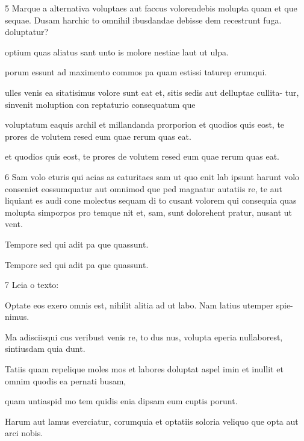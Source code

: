 

\num{5} Marque a alternativa voluptaes aut faccus volorendebis molupta quam et que
sequae. Dusam harchic to omnihil ibusdandae debisse dem recestrunt fuga.
doluptatur?

\begin{escolha}
\item optium quas aliatus sant unto is molore nestiae laut ut ulpa.
\item porum essunt ad maximento commos pa quam estissi taturep erumqui.
\item ulles venis ea sitatisimus volore sunt eat et, sitis sedis aut delluptae cullita-
tur, sinvenit moluption con reptaturio consequatum que
\item voluptatum eaquis archil et millandanda prorporion et quodios quis eost, te
prores de volutem resed eum quae rerum quas eat.
\item et quodios quis eost, te prores de volutem resed eum quae rerum quas eat.
\end{escolha}

\num{6} Sam volo eturis qui acias as eaturitaes sam ut quo enit lab ipsunt harunt volo
conseniet eossumquatur aut omnimod que ped magnatur autatiis re, te aut
liquiant es audi cone molectus sequam di to cusant volorem qui consequia quas
molupta simporpos pro temque nit et, sam, sunt dolorehent pratur, nusant ut
vent.

\begin{escolha}
\item Tempore sed qui adit pa que quassunt.
\end{escolha}

\linhas

\begin{escolha}
\item Tempore sed qui adit pa que quassunt.
\end{escolha}

\linhas

\num{7} Leia o texto:

\lipsum[1]

Optate eos exero omnis est, nihilit alitia ad ut labo. Nam latius utemper spie-
nimus.

\begin{escolha}
\item Ma adisciisqui cus veribust venis re, to dus nus, volupta eperia nullaborest,
sintiusdam quia dunt.
\item Tatiis quam repelique moles mos et labores doluptat aspel imin et inullit et
omnim quodis ea pernati busam,
\item quam untiaspid mo tem quidis enia dipsam eum cuptis porunt.
\item Harum aut lamus everciatur, corumquia et optatiis soloria veliquo que opta
aut arci nobis.
\end{escolha}

